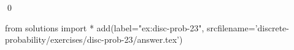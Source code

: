 
\begin{ex} 
  \label{ex:disc-prob-23}
  
  \qed
\end{ex} 
\begin{python0}
from solutions import *
add(label="ex:disc-prob-23",
    srcfilename='discrete-probability/exercises/disc-prob-23/answer.tex') 
\end{python0}
